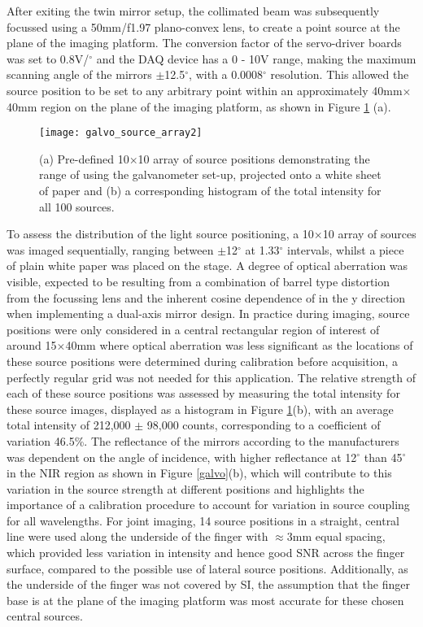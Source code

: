\documentclass[twoside]{bhamthesis}
\theoremstyle{definition}
\begin{document}
After exiting the twin mirror setup, the collimated beam was subsequently focussed using a 50mm/f1.97 plano-convex lens, to create a point source at the plane of the imaging platform. The conversion factor of the servo-driver boards was set to 0.8V/$^\circ$ and the DAQ device has a 0 - 10V range, making the maximum scanning angle of the mirrors $\pm$12.5$^\circ$, with a 0.0008$^\circ$ resolution. This allowed the source position to be set to any arbitrary point within an approximately 40mm$\times$40mm region on the plane of the imaging platform, as shown in Figure \ref{fig:Galvo_histogram} (a).

\begin{figure}[!ht]
\centering
  \texttt{[image: galvo\_source\_array2]} 
\caption{(a) Pre-defined 10$\times$10 array of source positions demonstrating the range of using the galvanometer set-up, projected onto a white sheet of paper and (b) a corresponding histogram of the total intensity for all 100 sources.}
\label{fig:Galvo_histogram}
\end{figure} 

To assess the distribution of the light source positioning, a 10$\times$10 array of sources was imaged sequentially, ranging between $\pm$12$^\circ$ at 1.33$^\circ$ intervals, whilst a piece of plain white paper was placed on the stage. A degree of optical aberration was visible, expected to be resulting from a combination of barrel type distortion from the focussing lens and the inherent cosine dependence of in the y direction when implementing a dual-axis mirror design. In practice during imaging, source positions were only considered in a central rectangular region of interest of around 15$\times$40mm where optical aberration was less significant as the locations of these source positions were determined during calibration before acquisition, a perfectly regular grid was not needed for this application. The relative strength of each of these source positions was assessed by measuring the total intensity for these source images, displayed as a histogram in Figure \ref{fig:Galvo_histogram}(b), with an average total intensity of 212,000 $\pm$ 98,000 counts, corresponding to a coefficient of variation 46.5\%. The reflectance of the mirrors according to the manufacturers was dependent on the angle of incidence, with higher reflectance at 12$^\circ$ than 45$^\circ$ in the NIR region as shown in Figure \ref{galvo}(b), which will contribute to this variation in the source strength at different positions and highlights the importance of a calibration procedure to account for variation in source coupling for all wavelengths. For joint imaging, 14 source positions in a straight, central line were used along the underside of the finger with $\approx$3mm equal spacing, which provided less variation in intensity and hence good SNR across the finger surface, compared to the possible use of lateral source positions. Additionally, as the underside of the finger was not covered by SI, the assumption that the finger base is at the plane of the imaging platform was most accurate for these chosen central sources.
\end{document}
